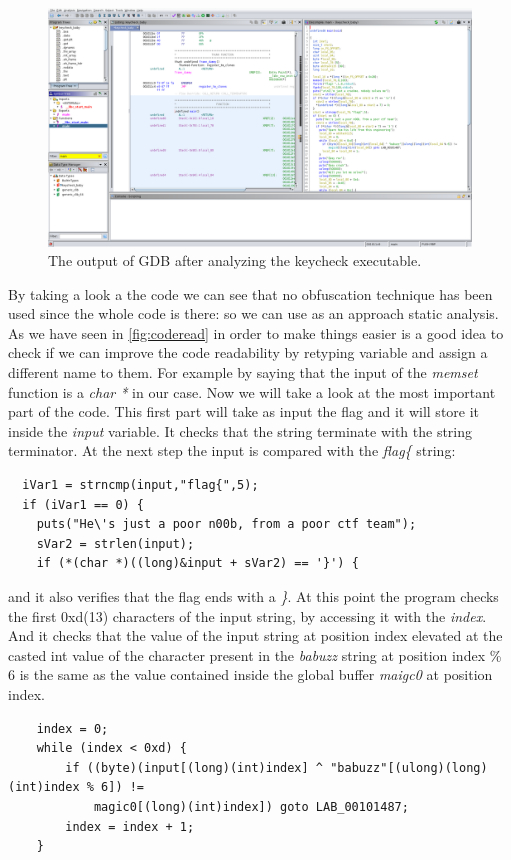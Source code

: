 \documentclass{article}
\begin{document}
\begin{figure}[htp]
    \centering
    \includegraphics[width=1\textwidth]{images/ghidrakeycheck.png}
    \caption{The output of GDB after analyzing the keycheck executable.}
    \label{fig:keycheckgdb}
\end{figure}
By taking a look a the code we can see that no obfuscation technique has been used since the whole code is there: so we can use as an approach static analysis.
As we have seen in \ref{fig:coderead} in order to make things easier is a good idea to check if we can improve the code readability by retyping variable and assign a different name to them.
For example by saying that the input of the \textit{memset} function is a \textit{char *} in our case.
Now we will take a look at the most important part of the code.
This first part will take as input the flag and it will store it inside the \textit{input} variable. It checks that the string terminate with the string terminator.
At the next step the input is compared with the \textit{flag\{} string:
\begin{verbatim}
  iVar1 = strncmp(input,"flag{",5);
  if (iVar1 == 0) {
    puts("He\'s just a poor n00b, from a poor ctf team");
    sVar2 = strlen(input);
    if (*(char *)((long)&input + sVar2) == '}') {
\end{verbatim}
and it also verifies that the flag ends with a \textit{\}}.
At this point the program checks the first 0xd(13) characters of the input string, by accessing it with the \textit{index}. And it checks that the value of the input string at position index elevated
at the casted int value of the character present in the \textit{babuzz} string at position index \% 6 is the same as the value contained inside the global buffer \textit{maigc0} at position index.
\begin{verbatim}
    index = 0;
    while (index < 0xd) {
        if ((byte)(input[(long)(int)index] ^ "babuzz"[(ulong)(long)(int)index % 6]) !=
            magic0[(long)(int)index]) goto LAB_00101487;
        index = index + 1;
    }
\end{verbatim}
\end{document}
